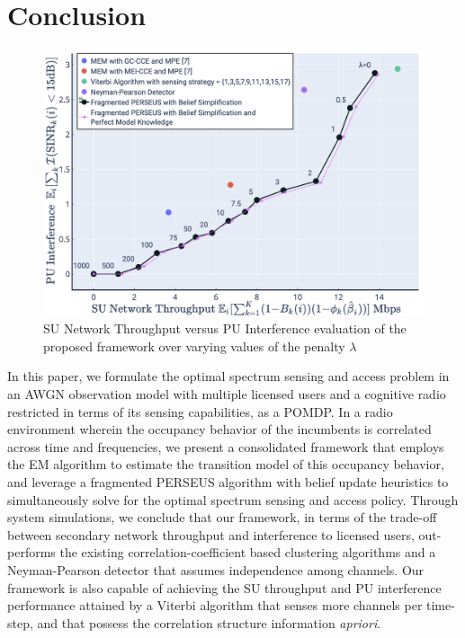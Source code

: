 \documentclass[10pt,twocolumn]{IEEEtran}
\begin{document}
\section{Conclusion}\label{V}
\begin{figure}
    \centering
    \includegraphics[width=0.80\linewidth]{SU_Throughput_PU_Interference_Varying_Penalty.png}
    \caption{SU Network Throughput versus PU Interference evaluation of the proposed framework over varying values of the penalty $\lambda$}
    \vspace{-5mm}
    \label{fig:8}
\end{figure}
In this paper, we formulate the optimal spectrum sensing and access problem in an AWGN observation model with multiple licensed users and a cognitive radio restricted in terms of its sensing capabilities, as a POMDP. In a radio environment wherein the occupancy behavior of the incumbents is correlated across time and frequencies, we present a consolidated framework that employs the EM algorithm to estimate the transition model of this occupancy behavior, and leverage a fragmented PERSEUS algorithm with belief update heuristics to simultaneously solve for the optimal spectrum sensing and access policy. Through system simulations, we conclude that our framework, in terms of the trade-off between secondary network throughput and interference to licensed users, out-performs the existing correlation-coefficient based clustering algorithms and a Neyman-Pearson detector that assumes independence among channels. Our framework is also capable of achieving the SU throughput and PU interference performance attained by a Viterbi algorithm that senses more channels per time-step, and that possess the correlation structure information \emph{apriori}.
\vspace{-5mm}



\end{document}
